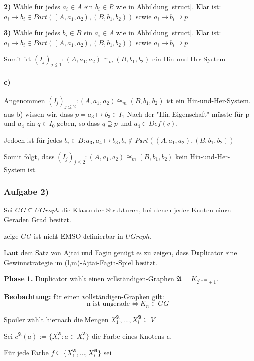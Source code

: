 \documentclass[12pt]{article}
\begin{document}
\textbf{2)} Wähle für jedes $a_i\in A$ ein $b_i\in B$ wie in Abbildung \ref{struct}. Klar ist: $ a_i \mapsto b_i \in Part((A,a_1,a_2), (B,b_1,b_2))$ sowie $a_i \mapsto b_i \supseteq p$

\textbf{3)} Wähle für jedes $b_i\in B$ ein $a_i\in A$ wie in Abbildung \ref{struct}. Klar ist: $ a_i \mapsto b_i \in Part((A,a_1,a_2), (B,b_1,b_2))$ sowie $a_i \mapsto b_i \supseteq p$

Somit ist $(I_j)_{j\leq 1}: (A,a_1,a_2) \cong_m (B,b_1,b_2)$ ein Hin-und-Her-System.

\paragraph{c)}
Angenommen $(I_j)_{j\leq 2}: (A,a_1,a_2) \cong_m (B,b_1,b_2)$ ist ein Hin-und-Her-System.
aus b) wissen wir, dass $p = a_3 \mapsto b_3 \in I_1$
Nach der "Hin-Eigenschaft" müsste für p und $a_4$ ein $q\in I_0$ geben, so dass $q\supseteq p$ und $a_4 \in Def(q)$.

Jedoch ist für jedes $b_i\in B: a_3,a_4 \mapsto b_3,b_i \notin Part((A,a_1,a_2), (B,b_1,b_2))$ 

Somit folgt, dass $(I_j)_{j\leq 2}: (A,a_1,a_2) \cong_m (B,b_1,b_2)$ kein Hin-und-Her-System ist. 


\subsubsection*{Aufgabe 2)}
Sei $GG\subseteq UGraph$ die Klasse der Strukturen, bei denen jeder Knoten 
einen Geraden Grad besitzt. 

zeige $GG$ ist nicht EMSO-definierbar in $UGraph$.

Laut dem Satz von Ajtai und Fagin genügt es zu zeigen, dass Duplicator eine 
Gewinnstrategie im (l,m)-Ajtai-Fagin-Spiel besitzt.

\textbf{Phase 1.} Duplicator wählt einen vollständigen-Graphen $\mathfrak{A} = K_{2^{l+m}+1}$.

\textbf{Beobachtung:} für einen vollständigen-Graphen gilt:
  \[ \text{n ist ungerade} \Leftrightarrow K_n \in GG \] 
  
Spoiler wählt hiernach die Mengen $X_1^\mathfrak{A}, ..., X_l^\mathfrak{A} 
\subseteq V$

Sei $c^\mathfrak{A}(a) := \{ X_i^\mathfrak{A} : a\in X_i^\mathfrak{A} \}$ die
Farbe eines Knotens $a$. 

Für jede Farbe $f\subseteq \{ X_1^\mathfrak{A}, ..., X_l^\mathfrak{A} \}$ sei
\end{document}
